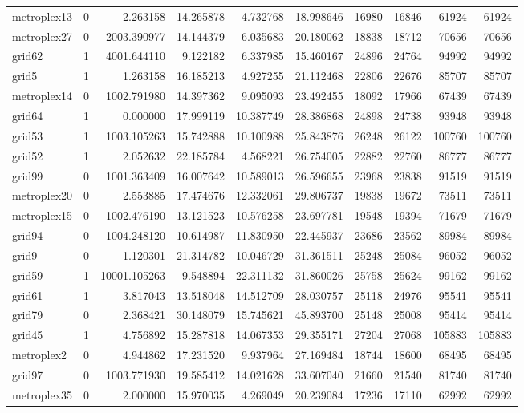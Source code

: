 \begin{longtable}{|l|r|r|r|r|r|r|r|r|r|}
metroplex13 & 0 & 2.263158 & 14.265878 & 4.732768 & 18.998646 & 16980 & 16846 & 61924 & 61924 \\
metroplex27 & 0 & 2003.390977 & 14.144379 & 6.035683 & 20.180062 & 18838 & 18712 & 70656 & 70656 \\
grid62 & 1 & 4001.644110 & 9.122182 & 6.337985 & 15.460167 & 24896 & 24764 & 94992 & 94992 \\
grid5 & 1 & 1.263158 & 16.185213 & 4.927255 & 21.112468 & 22806 & 22676 & 85707 & 85707 \\
metroplex14 & 0 & 1002.791980 & 14.397362 & 9.095093 & 23.492455 & 18092 & 17966 & 67439 & 67439 \\
grid64 & 1 & 0.000000 & 17.999119 & 10.387749 & 28.386868 & 24898 & 24738 & 93948 & 93948 \\
grid53 & 1 & 1003.105263 & 15.742888 & 10.100988 & 25.843876 & 26248 & 26122 & 100760 & 100760 \\
grid52 & 1 & 2.052632 & 22.185784 & 4.568221 & 26.754005 & 22882 & 22760 & 86777 & 86777 \\
grid99 & 0 & 1001.363409 & 16.007642 & 10.589013 & 26.596655 & 23968 & 23838 & 91519 & 91519 \\
metroplex20 & 0 & 2.553885 & 17.474676 & 12.332061 & 29.806737 & 19838 & 19672 & 73511 & 73511 \\
metroplex15 & 0 & 1002.476190 & 13.121523 & 10.576258 & 23.697781 & 19548 & 19394 & 71679 & 71679 \\
grid94 & 0 & 1004.248120 & 10.614987 & 11.830950 & 22.445937 & 23686 & 23562 & 89984 & 89984 \\
grid9 & 0 & 1.120301 & 21.314782 & 10.046729 & 31.361511 & 25248 & 25084 & 96052 & 96052 \\
grid59 & 1 & 10001.105263 & 9.548894 & 22.311132 & 31.860026 & 25758 & 25624 & 99162 & 99162 \\
grid61 & 1 & 3.817043 & 13.518048 & 14.512709 & 28.030757 & 25118 & 24976 & 95541 & 95541 \\
grid79 & 0 & 2.368421 & 30.148079 & 15.745621 & 45.893700 & 25148 & 25008 & 95414 & 95414 \\
grid45 & 1 & 4.756892 & 15.287818 & 14.067353 & 29.355171 & 27204 & 27068 & 105883 & 105883 \\
metroplex2 & 0 & 4.944862 & 17.231520 & 9.937964 & 27.169484 & 18744 & 18600 & 68495 & 68495 \\
grid97 & 0 & 1003.771930 & 19.585412 & 14.021628 & 33.607040 & 21660 & 21540 & 81740 & 81740 \\
metroplex35 & 0 & 2.000000 & 15.970035 & 4.269049 & 20.239084 & 17236 & 17110 & 62992 & 62992 \\

\end{longtable}
